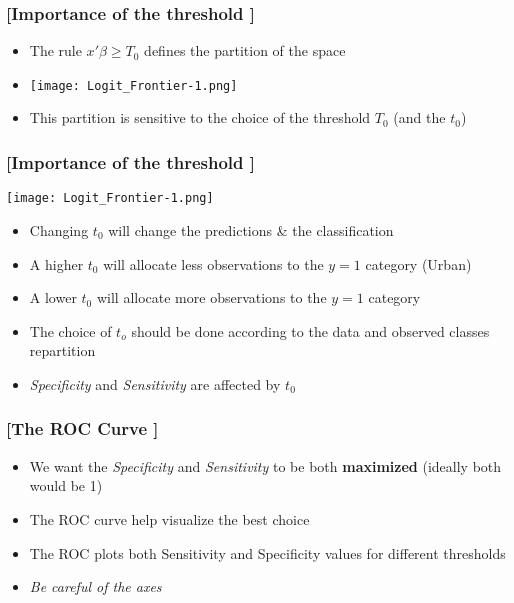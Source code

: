 \documentclass[xcolor=x11names,compress, handhouts]{beamer}
\renewcommand{\(}{\begin{columns}}
\renewcommand{\)}{\end{columns}}
\newcommand{\<}[1]{\begin{column}{#1}}
\renewcommand{\>}{\end{column}}
\begin{document}
\begin{frame} %
\frametitle{\textcolor{brique}{[Importance of the threshold ]}}
\pause
 \begin{itemize}[<+->]
  \item The rule $ x'\beta \geq T_0$ defines the partition of the space
  \item[] \begin{center}\texttt{[image: Logit\_Frontier-1.png]} \end{center}
  \item This partition is sensitive to the choice of the threshold $T_0$ (and the $t_0$)
\end{itemize}
\end{frame}


\begin{frame} %
\frametitle{\textcolor{brique}{[Importance of the threshold ]}}
 \hfill \texttt{[image: Logit\_Frontier-1.png]}
\pause
 \begin{itemize}[<+->]
  \item Changing $t_0$ will  change the predictions \&  the classification
  \item[] A higher $t_0$ will allocate less observations to the $y=1$ category (Urban)
  \item[] A lower $t_0$ will allocate more observations to the $y=1$ category
  \item The choice of $t_o$ should be done according to the data and observed classes repartition
  \item \textit{Specificity} and \textit{Sensitivity} are affected by $t_0$
\end{itemize}
\end{frame}


\begin{frame} %
\frametitle{\textcolor{brique}{[The ROC Curve ]}}
\pause
 \begin{itemize}[<+->]
  \item We want the \textit{Specificity} and \textit{Sensitivity} to be both \textbf{maximized} (ideally both would be 1)
  \item The ROC curve help visualize the best choice
  \item The ROC plots both Sensitivity and Specificity values for different thresholds
  \item[] \textit{Be careful of the axes }
\end{itemize}
\end{frame}
\end{document}
